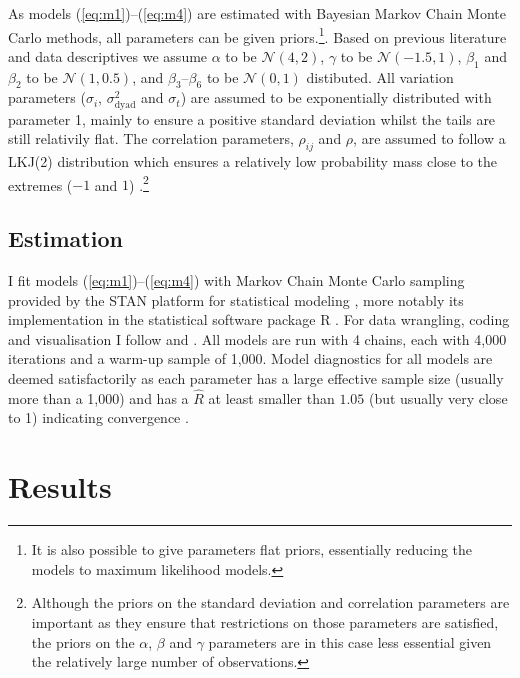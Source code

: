 \documentclass[11pt,parskip,abstracton,notitlepage, dvipsnames]{scrartcl}
\begin{document}
As models (\ref{eq:m1})--(\ref{eq:m4}) are estimated with Bayesian Markov Chain Monte Carlo methods, all parameters can be given priors.\footnote{It is also possible to give parameters flat priors, essentially reducing the models to maximum likelihood models.}. Based on previous literature and data descriptives we assume $\alpha$ to be $\mathcal{N}(4,2)$, $\gamma$ to be $\mathcal{N}(-1.5,1)$, $\beta_1$ and $\beta_2$ to be $\mathcal{N}(1, 0.5)$, and $\beta_3$--$\beta_6$ to be $\mathcal{N}(0,1)$ distibuted. All variation parameters ($\sigma_i$, $\sigma^2_{\text{dyad}}$ and $\sigma_t$) are assumed to be exponentially distributed with parameter 1, mainly to ensure a positive standard deviation whilst the tails are still relativily flat. The correlation parameters, $\rho_{ij}$ and $\rho$, are assumed to follow a LKJ(2) distribution which ensures a relatively low probability mass close to the extremes ($-1$ and $1$) \citep{lewandowski2009generating}.\footnote{Although the priors on the standard deviation and correlation parameters are important as they ensure that restrictions on those parameters are satisfied, the priors on the $\alpha$, $\beta$ and $\gamma$ parameters are in this case less essential given the relatively large number of observations.}

\subsection{Estimation}

I fit models (\ref{eq:m1})--(\ref{eq:m4}) with Markov Chain Monte Carlo sampling provided by the STAN platform for statistical modeling \citep{gelman2015stan}, more notably its implementation in the statistical software package R \citep{r2021, rstan2020}. For data wrangling, coding and visualisation I follow \citet{mcelreath2020statistical} and \citet{kurzStatisticalRethinkingSecondEd2021}. All models are run with 4 chains, each with 4,000 iterations and a warm-up sample of 1,000. Model diagnostics for all models are deemed satisfactorily as each parameter has a large effective sample size (usually more than a 1,000) and has a $\widehat{R}$ at least smaller than $1.05$ (but usually very close to 1) indicating convergence \citep{vehtari2019rank}.

\section{Results}
\end{document}

